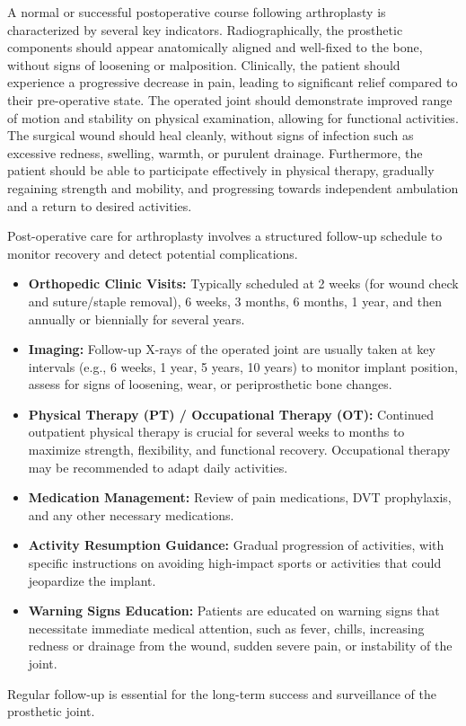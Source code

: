 A normal or successful postoperative course following arthroplasty is characterized by several key indicators. Radiographically, the prosthetic components should appear anatomically aligned and well-fixed to the bone, without signs of loosening or malposition. Clinically, the patient should experience a progressive decrease in pain, leading to significant relief compared to their pre-operative state. The operated joint should demonstrate improved range of motion and stability on physical examination, allowing for functional activities. The surgical wound should heal cleanly, without signs of infection such as excessive redness, swelling, warmth, or purulent drainage. Furthermore, the patient should be able to participate effectively in physical therapy, gradually regaining strength and mobility, and progressing towards independent ambulation and a return to desired activities.

Post-operative care for arthroplasty involves a structured follow-up schedule to monitor recovery and detect potential complications.
\begin{itemize}
  \item \textbf{Orthopedic Clinic Visits:} Typically scheduled at 2 weeks (for wound check and suture/staple removal), 6 weeks, 3 months, 6 months, 1 year, and then annually or biennially for several years.
  \item \textbf{Imaging:} Follow-up X-rays of the operated joint are usually taken at key intervals (e.g., 6 weeks, 1 year, 5 years, 10 years) to monitor implant position, assess for signs of loosening, wear, or periprosthetic bone changes.
  \item \textbf{Physical Therapy (PT) / Occupational Therapy (OT):} Continued outpatient physical therapy is crucial for several weeks to months to maximize strength, flexibility, and functional recovery. Occupational therapy may be recommended to adapt daily activities.
  \item \textbf{Medication Management:} Review of pain medications, DVT prophylaxis, and any other necessary medications.
  \item \textbf{Activity Resumption Guidance:} Gradual progression of activities, with specific instructions on avoiding high-impact sports or activities that could jeopardize the implant.
  \item \textbf{Warning Signs Education:} Patients are educated on warning signs that necessitate immediate medical attention, such as fever, chills, increasing redness or drainage from the wound, sudden severe pain, or instability of the joint.
\end{itemize}
Regular follow-up is essential for the long-term success and surveillance of the prosthetic joint.

